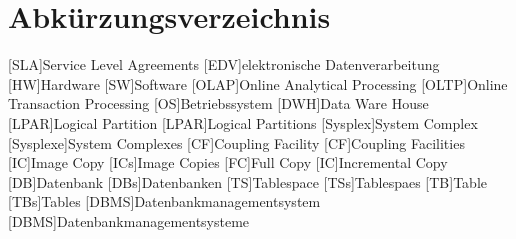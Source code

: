 \chapter*{Abkürzungsverzeichnis}
\begin{acronym}
  
  [SLA]{Service Level Agreements}
  [EDV]{elektronische Datenverarbeitung}
  [HW]{Hardware}
  [SW]{Software}
  [OLAP]{Online Analytical Processing}
  [OLTP]{Online Transaction Processing}
  [OS]{Betriebssystem}
  [DWH]{Data Ware House}
  [LPAR]{Logical Partition}
  [LPAR]{Logical Partitions}
  [Sysplex]{System Complex}
  [Sysplexe]{System Complexes}
  [CF]{Coupling Facility}
  [CF]{Coupling Facilities}
  [IC]{Image Copy}
  [ICs]{Image Copies}
  [FC]{Full Copy}
  [IC]{Incremental Copy}
  [DB]{Datenbank}
  [DBs]{Datenbanken}
  [TS]{Tablespace}
  [TSs]{Tablespaes}
  [TB]{Table}
  [TBs]{Tables}
  [DBMS]{Datenbankmanagementsystem}
  [DBMS]{Datenbankmanagementsysteme}
  
  
\end{acronym}


